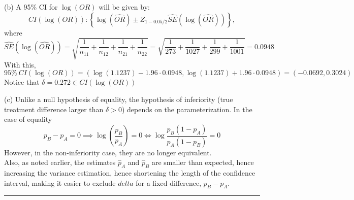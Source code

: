\documentclass[11pt,a4paper]{article}
\begin{document}
\noindent
(b) A 95\% CI for $\log (OR)$ will be given by:
$$CI(\log (OR)):\left\{\log (\widehat{OR})\pm Z_{1-0.05/2}\widehat{SE}(\log (\widehat{OR}))\right\},$$
where 
\[ \widehat{SE}(\log (\widehat{OR})) = \sqrt{\frac{1}{n_{11}}+\frac{1}{n_{12}}+\frac{1}{n_{21}}+\frac{1}{n_{22}}} = \sqrt{\frac{1}{273}+\frac{1}{1027}+\frac{1}{299}+\frac{1}{1001}} = 0.0948 \]
With this, 
\[ 95\%  ~CI(\log (OR)) = (\log(1.1237)-1.96\cdot 0.0948 , \log(1.1237)+1.96\cdot 0.0948) = (-0.0692,  0.3024) \]
Notice that $\delta=0.272\in CI(\log (OR))$

\noindent
(c) Unlike a null hypothesis of equality, the hypothesis of inferiority (true treatment difference larger than $\delta > 0$) depends on the parameterization. In the case of equality
$$p_B - p_A = 0 \implies \log(\frac{p_B}{p_A}) = 0 \iff \log\frac{p_B(1 - p_A)}{p_A(1 - p_B)} = 0$$ However, in the non-inferiority case, they are no longer equivalent. \\
Also, as noted earlier, the estimates $\hat{p}_A$ and $\hat{p}_B$ are smaller than expected, hence increasing the variance estimation, hence shortening the length of the confidence interval, making it easier to exclude
$delta$ for a fixed difference, $p_B - p_A$. \\
\noindent\rule{16cm}{0.4pt} \\
\end{document}
